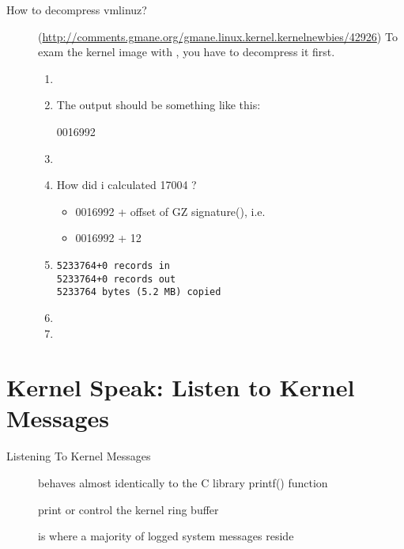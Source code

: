 \begin{description}
\item[How to decompress vmlinuz?]
  (\url{http://comments.gmane.org/gmane.linux.kernel.kernelnewbies/42926}) To exam the
  kernel image with , you have to decompress it first.
  \begin{enumerate}
  \item {}
  \item {}

    The output should be something like this:
    \begin{center}
      0016992 
    \end{center}
  \item {}
  \item How did i calculated 17004 ?
    \begin{itemize}
    \item[] 0016992 + offset of GZ signature(), i.e.
    \item[] 0016992 + 12
    \end{itemize}
  \item {}
\begin{verbatim}
5233764+0 records in
5233764+0 records out
5233764 bytes (5.2 MB) copied
\end{verbatim}
  \item {}
  \item {}
  \end{enumerate}
\end{description}

\section{Kernel Speak: Listen to Kernel Messages}
\label{sec:kernel-speak:-listen}

\begin{frame}{Listening To Kernel Messages}
  \begin{description}
  \item[] behaves almost identically to the C library printf() function
  \item[] print or control the kernel ring buffer
  \item[] is where a majority of logged system messages reside
  \end{description}
\end{frame}



